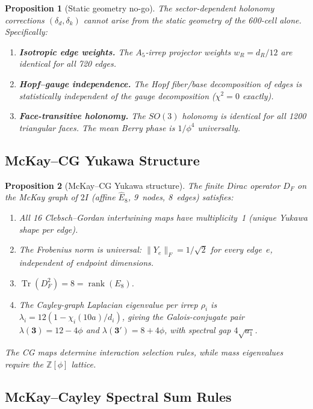 \documentclass[12pt,a4paper]{article}
\newtheorem{proposition}{Proposition}
\theoremstyle{definition}
\begin{document}
\begin{proposition}[Static geometry no-go]\label{prop:S-nogo}
The sector-dependent holonomy corrections $(\delta_d, \delta_k)$ cannot arise from
the static geometry of the 600-cell alone. Specifically:
\begin{enumerate}
\item[(i)] \textbf{Isotropic edge weights.} The $A_5$-irrep projector weights
  $w_R = d_R/12$ are identical for all 720 edges.
\item[(ii)] \textbf{Hopf--gauge independence.} The Hopf fiber/base decomposition
  of edges is statistically independent of the gauge decomposition ($\chi^2 = 0$ exactly).
\item[(iii)] \textbf{Face-transitive holonomy.} The $SO(3)$ holonomy is identical
  for all 1200 triangular faces. The mean Berry phase is $1/\phi^4$ universally.
\end{enumerate}
\end{proposition}

\subsection{McKay--CG Yukawa Structure}

\begin{proposition}[McKay--CG Yukawa structure]\label{prop:S-mckay-df}
The finite Dirac operator $D_F$ on the McKay graph of $2I$ (affine $\hat{E}_8$,
9~nodes, 8~edges) satisfies:
\begin{enumerate}
\item[(i)] All 16 Clebsch--Gordan intertwining maps have multiplicity~1
  (unique Yukawa shape per edge).
\item[(ii)] The Frobenius norm is \emph{universal}: $\|Y_e\|_F = 1/\sqrt{2}$
  for every edge~$e$, independent of endpoint dimensions.
\item[(iii)] $\operatorname{Tr}(D_F^2) = 8 = \operatorname{rank}(E_8)$.
\item[(iv)] The Cayley-graph Laplacian eigenvalue per irrep $\rho_i$ is
  $\lambda_i = 12(1 - \chi_i(10a)/d_i)$, giving the Galois-conjugate pair
  $\lambda(\mathbf{3}) = 12 - 4\phi$ and
  $\lambda(\mathbf{3'}) = 8 + 4\phi$,
  with spectral gap $4\sqrt{a_1}$.
\end{enumerate}
The CG maps determine interaction \emph{selection rules},
while mass \emph{eigenvalues} require the $\mathbb{Z}[\phi]$ lattice.
\end{proposition}

\subsection{McKay--Cayley Spectral Sum Rules}
\end{document}
